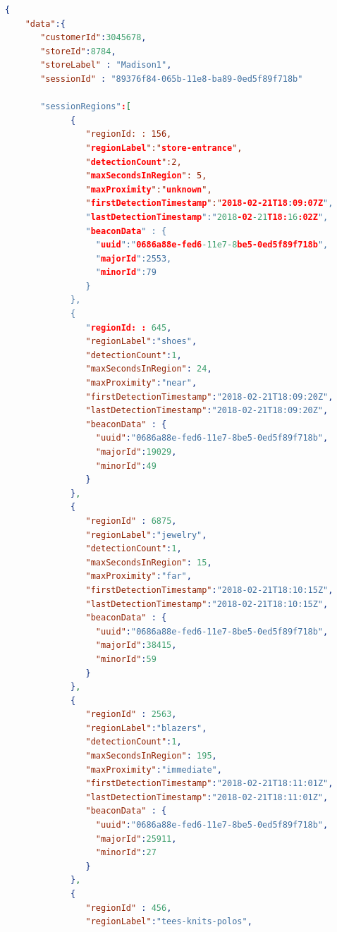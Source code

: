 \vspace{0.5cm}
\begin{lstlisting}[language=json,firstnumber=1]
  {
    "data":{
       "customerId":3045678,
       "storeId":8784,
       "storeLabel" : "Madison1",
       "sessionId" : "89376f84-065b-11e8-ba89-0ed5f89f718b"

       "sessionRegions":[
             {
                "regionId: : 156,
                "regionLabel":"store-entrance",
                "detectionCount":2,
                "maxSecondsInRegion": 5,
                "maxProximity":"unknown",
                "firstDetectionTimestamp":"2018-02-21T18:09:07Z",
                "lastDetectionTimestamp":"2018-02-21T18:16:02Z",
                "beaconData" : {
                  "uuid":"0686a88e-fed6-11e7-8be5-0ed5f89f718b",
                  "majorId":2553,
                  "minorId":79
                }
             },
             {
                "regionId: : 645,
                "regionLabel":"shoes",
                "detectionCount":1,
                "maxSecondsInRegion": 24,
                "maxProximity":"near",
                "firstDetectionTimestamp":"2018-02-21T18:09:20Z",
                "lastDetectionTimestamp":"2018-02-21T18:09:20Z",
                "beaconData" : {
                  "uuid":"0686a88e-fed6-11e7-8be5-0ed5f89f718b",
                  "majorId":19029,
                  "minorId":49
                }
             },
             {
                "regionId" : 6875,
                "regionLabel":"jewelry",
                "detectionCount":1,
                "maxSecondsInRegion": 15,
                "maxProximity":"far",
                "firstDetectionTimestamp":"2018-02-21T18:10:15Z",
                "lastDetectionTimestamp":"2018-02-21T18:10:15Z",
                "beaconData" : {
                  "uuid":"0686a88e-fed6-11e7-8be5-0ed5f89f718b",
                  "majorId":38415,
                  "minorId":59
                }
             },
             {
                "regionId" : 2563,
                "regionLabel":"blazers",
                "detectionCount":1,
                "maxSecondsInRegion": 195,
                "maxProximity":"immediate",
                "firstDetectionTimestamp":"2018-02-21T18:11:01Z",
                "lastDetectionTimestamp":"2018-02-21T18:11:01Z",
                "beaconData" : {
                  "uuid":"0686a88e-fed6-11e7-8be5-0ed5f89f718b",
                  "majorId":25911,
                  "minorId":27
                }
             },
             {
                "regionId" : 456,
                "regionLabel":"tees-knits-polos",

\end{lstlisting}
